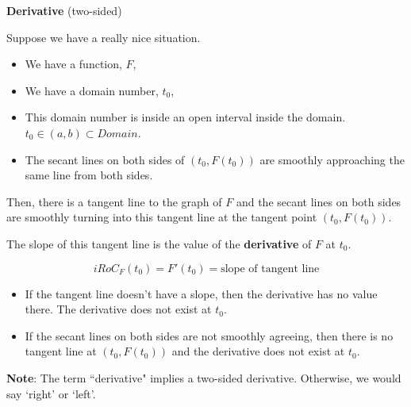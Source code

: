 \documentclass{ximera}
\begin{document}
\begin{definition} \textbf{\textcolor{green!50!black}{Derivative}}  (two-sided)


Suppose we have a really nice situation.


\begin{itemize}
\item We have a function, $F$, 
\item We have a domain number, $t_0$, 
\item This domain number is inside an open interval inside the domain.  $t_0 \in (a, b) \subset Domain$. 
\item The secant lines on both sides of $(t_0, F(t_0))$ are smoothly approaching the same line from both sides.
\end{itemize}

Then, there is a tangent line to the graph of $F$ and the secant lines on both sides are smoothly turning into this tangent line at the tangent point $(t_0, F(t_0))$. 

The slope of this tangent line is the value of the \textbf{derivative} of $F$ at $t_0$.

\[
iRoC_F(t_0) =F'(t_0) = \text{slope of tangent line}
\]


\begin{itemize}
  \item If the tangent line doesn't have a slope, then the derivative has no value there. The derivative does not exist at $t_0$.

  \item If the secant lines on both sides are not smoothly agreeing, then there is no tangent line at $(t_0, F(t_0))$ and the derivative does not exist at $t_0$.   
\end{itemize}

\end{definition}

\textbf{Note}: The term ``derivative" implies a two-sided derivative.  Otherwise, we would say `right' or `left'. 
\end{document}
